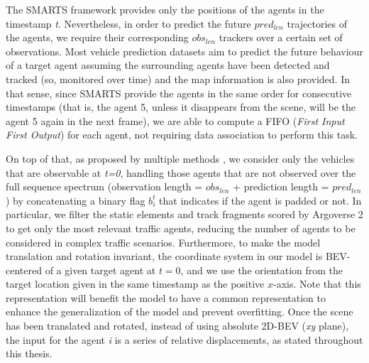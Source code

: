 
The \acf{SMARTS} \cite{SMARTS} framework provides only the positions of the agents in the timestamp \textit{t}. Nevertheless, in order to predict the future $pred_{len}$ trajectories of the agents, we require their corresponding $obs_{len}$ trackers over a certain set of observations. Most vehicle prediction datasets \cite{wilson2023argoverse} aim to predict the future behaviour of a target agent assuming the surrounding agents have been detected and tracked (so, monitored over time) and the map information is also provided. In that sense, since \ac{SMARTS} provide the agents in the same order for consecutive timestamps (that is, the agent 5, unless it disappears from the scene, will be the agent 5 again in the next frame), we are able to compute a FIFO (\textit{First Input First Output}) for each agent, not requiring data association \cite{kuhn1955hungarian} to perform this task. 

On top of that, as proposed by multiple methods \cite{liang2020learning, gomez2023improving}, we consider only the vehicles that are observable at \textit{t=0}, handling those agents that are not observed over the full sequence spectrum (observation length = \textit{$obs_{len}$} + prediction length = \textit{$pred_{len}$}) by concatenating a binary flag $b_i^t$ that indicates if the agent is padded or not. In particular, we filter the static elements and track fragments scored by Argoverse 2 to get only the most relevant traffic agents, reducing the number of agents to be considered in complex traffic scenarios. Furthermore, to make the model translation and rotation invariant, the coordinate system in our model is \ac{BEV}-centered of a given target agent at $t = 0$, and we use the orientation from the target location given in the same timestamp as the positive $x$-axis. Note that this representation will benefit the model to have a common representation to enhance the generalization of the model and prevent overfitting. Once the scene has been translated and rotated, instead of using absolute 2D-\ac{BEV} (\textit{xy} plane), the input for the agent \textit{i} is a series of relative displacements, as stated throughout this thesis.

